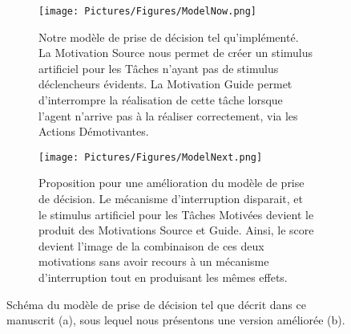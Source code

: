 	\begin{figure}
	\centering
	
	\begin{subfigure}{\textwidth}
	\centering
	\texttt{[image: Pictures/Figures/ModelNow.png]}
	\caption{Notre modèle de prise de décision tel qu'implémenté. La Motivation Source nous permet de créer un stimulus artificiel pour les Tâches n'ayant pas de stimulus déclencheurs évidents. La Motivation Guide permet d'interrompre la réalisation de cette tâche lorsque l'agent n'arrive pas à la réaliser correctement, via les Actions Démotivantes.}
	\label{ModelNow}	
	\end{subfigure}
	
	\begin{subfigure}{\textwidth}
	\centering
	\texttt{[image: Pictures/Figures/ModelNext.png]}
	\caption{Proposition pour une amélioration du modèle de prise de décision. Le mécanisme d'interruption disparait, et le stimulus artificiel pour les Tâches Motivées devient le produit des Motivations Source et Guide. Ainsi, le score devient l'image de la combinaison de ces deux motivations sans avoir recours à un mécanisme d'interruption tout en produisant les mêmes effets.}
	\label{ModelNext}
	\end{subfigure}
	
	\caption{Schéma du modèle de prise de décision tel que décrit dans ce manuscrit (a), sous lequel nous présentons une version améliorée (b).}	
	\label{ModelsBeforeAfter}
	\end{figure}
	
